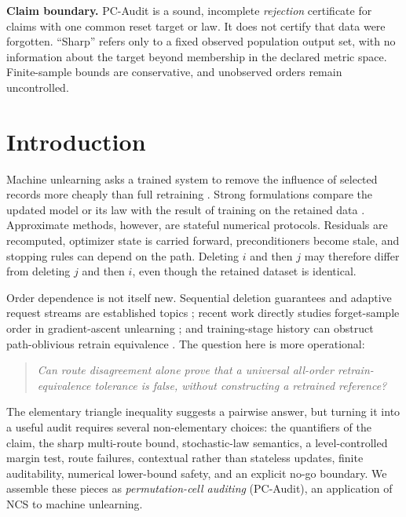 \documentclass[10pt]{article}
\theoremstyle{definition}
\theoremstyle{remark}
\begin{document}
\vspace{0.6em}
\begin{center}
\begin{minipage}{0.94\textwidth}
\colorbox{AuditGray}{%
\parbox{0.96\textwidth}{\small
\textbf{Claim boundary.}
PC-Audit is a sound, incomplete \emph{rejection} certificate for claims with one
common reset target or law. It does not certify that data were forgotten.
``Sharp'' refers only to a fixed observed population output set, with no
information about the target beyond membership in the declared metric space.
Finite-sample bounds are conservative, and unobserved orders remain
uncontrolled.}}
\end{minipage}
\end{center}

\section{Introduction}

Machine unlearning asks a trained system to remove the influence of selected
records more cheaply than full retraining
\citep{cao2015,ginart2019,bourtoule2021}. Strong formulations compare the
updated model or its law with the result of training on the retained data
\citep{guo2020,neel2021}. Approximate methods, however, are stateful numerical
protocols. Residuals are recomputed, optimizer state is carried forward,
preconditioners become stale, and stopping rules can depend on the path.
Deleting \(i\) and then \(j\) may therefore differ from deleting \(j\) and then
\(i\), even though the retained dataset is identical.

Order dependence is not itself new. Sequential deletion guarantees and
adaptive request streams are established topics
\citep{neel2021,gupta2021}; recent work directly studies forget-sample order in
gradient-ascent unlearning \citep{kumar2026}; and training-stage history can
obstruct path-oblivious retrain equivalence \citep{yu2025}. The question here is
more operational:

\begin{quote}
\emph{Can route disagreement alone prove that a universal all-order
retrain-equivalence tolerance is false, without constructing a retrained
reference?}
\end{quote}

The elementary triangle inequality suggests a pairwise answer, but turning it
into a useful audit requires several non-elementary choices: the quantifiers of
the claim, the sharp multi-route bound, stochastic-law semantics, a
level-controlled margin test, route failures, contextual rather than stateless
updates, finite auditability, numerical lower-bound safety, and an explicit
no-go boundary. We assemble these pieces as \emph{permutation-cell auditing}
(PC-Audit), an application of NCS to machine unlearning.
\end{document}
